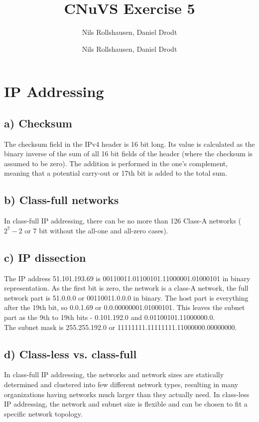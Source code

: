 \documentclass[a4paper, 11 pt, article, accentcolor=tud7b]{tudreport}
\title{CNuVS Exercise 5}
\author{Nils Rollshausen, Daniel Drodt}
\subtitle{Nils Rollshausen, Daniel Drodt}
\begin{document}
	\maketitle
	\section{IP Addressing}
	\subsection*{a) Checksum}
	  The checksum field in the IPv4 header is 16 bit long. Its value is calculated as the binary inverse of the sum of all 16 bit fields of the header (where the checksum is assumed to be zero). The addition is performed in the one's complement, meaning that a potential carry-out or 17th bit is added to the total sum.
	  
	\subsection*{b) Class-full networks}
	In class-full IP addressing, there can be no more than 126 Class-A networks ($2^7 - 2$ or 7 bit without the all-one and all-zero cases).
	
	\subsection*{c) IP dissection}
	The IP address 51.101.193.69 is 00110011.01100101.11000001.01000101 in binary representation. As the first bit is zero, the network is a class-A network, the full network part is 51.0.0.0 or 00110011.0.0.0 in binary. The host part is everything after the 19th bit, so 0.0.1.69 or 0.0.00000001.01000101. This leaves the subnet part as the 9th to 19th bits - 0.101.192.0 and 0.01100101.11000000.0. \\
	The subnet mask is 255.255.192.0 or 11111111.11111111.11000000.00000000.
	
	\subsection*{d) Class-less vs. class-full}
	In class-full IP addressing, the networks and network sizes are statically determined and clustered into few different network types, resulting in many organizations having networks much larger than they actually need. In class-less IP addressing, the network and subnet size is flexible and can be chosen to fit a specific network topology.
	
\end{document}
